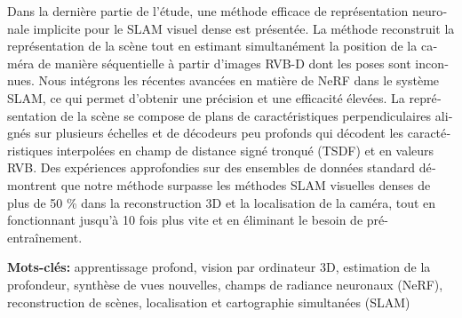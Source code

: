 \begin{otherlanguage}{french}
\vspace{2ex}
Dans la dernière partie de l'étude, une méthode efficace de représentation neuronale implicite pour le SLAM visuel dense est présentée. La méthode reconstruit la représentation de la scène tout en estimant simultanément la position de la caméra de manière séquentielle à partir d'images RVB-D dont les poses sont inconnues. Nous intégrons les récentes avancées en matière de NeRF dans le système SLAM, ce qui permet d'obtenir une précision et une efficacité élevées. La représentation de la scène se compose de plans de caractéristiques perpendiculaires alignés sur plusieurs échelles et de décodeurs peu profonds qui décodent les caractéristiques interpolées en champ de distance signé tronqué (TSDF) et en valeurs RVB. Des expériences approfondies sur des ensembles de données standard démontrent que notre méthode surpasse les méthodes SLAM visuelles denses de plus de 50 \% dans la reconstruction 3D et la localisation de la caméra, tout en fonctionnant jusqu'à 10 fois plus vite et en éliminant le besoin de pré-entraînement.

\vspace{2ex}
\textbf{Mots-clés:} apprentissage profond, vision par ordinateur 3D, estimation de la profondeur, synthèse de vues nouvelles, champs de radiance neuronaux (NeRF), reconstruction de scènes, localisation et cartographie simultanées (SLAM)

\end{otherlanguage}


